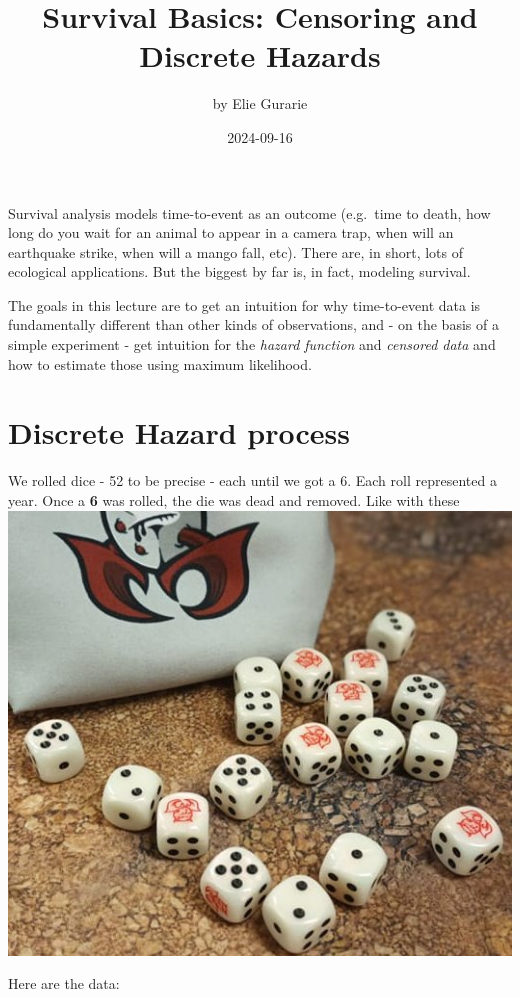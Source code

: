 \documentclass[]{tufte-handout}
\title{Survival Basics: Censoring and Discrete Hazards}
\author{by Elie Gurarie}
\date{2024-09-16}
\begin{document}
\maketitle




Survival analysis models time-to-event as an outcome (e.g.~time to
death, how long do you wait for an animal to appear in a camera trap,
when will an earthquake strike, when will a mango fall, etc). There are,
in short, lots of ecological applications. But the biggest by far is, in
fact, modeling survival.

The goals in this lecture are to get an intuition for why time-to-event
data is fundamentally different than other kinds of observations, and -
on the basis of a simple experiment - get intuition for the \emph{hazard
function} and \emph{censored data} and how to estimate those using
maximum likelihood.

\section{Discrete Hazard process}\label{discrete-hazard-process}

We rolled dice - 52 to be precise - each until we got a 6. Each roll
represented a year. Once a \textbf{6} was rolled, the die was dead and
removed. Like with these
\includegraphics{lectures/Survival/lethaldice.jpg}

Here are the data:
\end{document}
